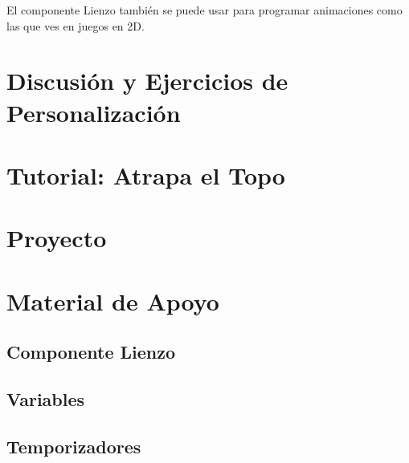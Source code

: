 El componente Lienzo también se puede usar para programar animaciones
como las que ves en juegos en 2D.

\section{Discusión y Ejercicios de Personalización}

\section{Tutorial: Atrapa el Topo}

\section{Proyecto}

\section{Material de Apoyo}

\subsection*{Componente Lienzo}

\subsection*{Variables}

\subsection*{Temporizadores}



